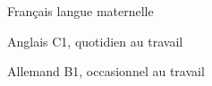 

\begin{cvpairs}

  
\cvpair
    {Français} %
    {langue maternelle} %


\cvpair
    {Anglais} %
    {C1, quotidien au travail} %


\cvpair
    {Allemand} %
    {B1, occasionnel au travail} %

\end{cvpairs}